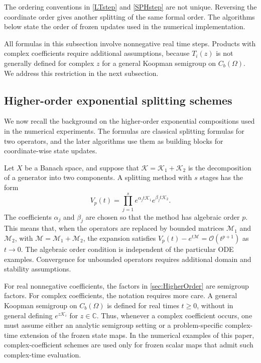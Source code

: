 \documentclass[preprint,1p,times,nopreprintline]{elsarticle}
\begin{document}
The ordering conventions in \eqref{LTstep} and \eqref{SPHstep} are not unique. Reversing the coordinate order gives another splitting of the same formal order. The algorithms below state the order of frozen updates used in the numerical implementation.

All formulas in this subsection involve nonnegative real time steps. Products with complex coefficients require additional assumptions, because $T_i(z)$ is not generally defined for complex $z$ for a general Koopman semigroup on $C_b(\Omega)$. We address this restriction in the next subsection.

\subsection{Higher-order exponential splitting schemes}
\label{sec:higher}

We now recall the background on the higher-order exponential compositions used in the numerical experiments. The formulas are classical splitting formulas for two operators, and the later algorithms use them as building blocks for coordinate-wise state updates.

Let $X$ be a Banach space, and suppose that $\mathcal{K}=\mathcal{K}_1+\mathcal{K}_2$ is the decomposition of a generator into two components. A splitting method with $s$ stages has the form
\begin{equation}
\label{sec:HigherOrder}
V_p(t)
=
\prod_{j=1}^s
e^{\alpha_j t\mathcal{K}_1}
e^{\beta_j t\mathcal{K}_2}.
\end{equation}
The coefficients $\alpha_j$ and $\beta_j$ are chosen so that the method has algebraic order $p$. This means that, when the operators are replaced by bounded matrices $\mathcal{M}_1$ and $\mathcal{M}_2$, with $\mathcal{M}=\mathcal{M}_1+\mathcal{M}_2$, the expansion satisfies $V_p(t)-e^{t\mathcal{M}} = \mathcal{O}(t^{p+1})$ as $t\to 0$. The algebraic order condition is independent of the particular ODE examples. Convergence for unbounded operators requires additional domain and stability assumptions.

For real nonnegative coefficients, the factors in \eqref{sec:HigherOrder} are semigroup factors. For complex coefficients, the notation requires more care. A general Koopman semigroup on $C_b(\Omega)$ is defined for real times $t\ge 0$, without in general defining $e^{z\mathcal{K}_i}$ for $z\in\mathbb{C}$. Thus, whenever a complex coefficient occurs, one must assume either an analytic semigroup setting or a problem-specific complex-time extension of the frozen state maps. In the numerical examples of this paper, complex-coefficient schemes are used only for frozen scalar maps that admit such complex-time evaluation.
\end{document}
